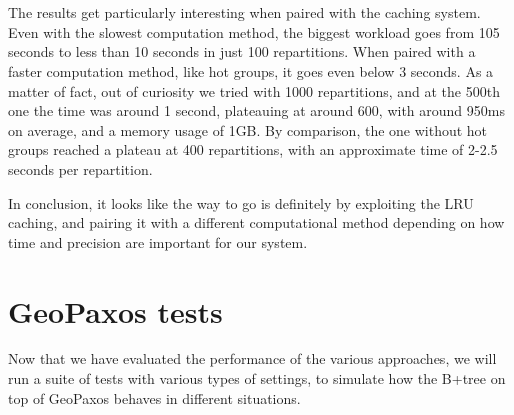 \\\\
The results get particularly interesting when paired with the caching system. Even with the slowest computation method, the biggest workload goes from 105 seconds to less than 10 seconds in just 100 repartitions. When paired with a faster computation method, like hot groups, it goes even below 3 seconds. As a matter of fact, out of curiosity we tried with 1000 repartitions, and at the 500th one the time was around 1 second, plateauing at around 600, with around 950ms on average, and a memory usage of 1GB.
By comparison, the one without hot groups reached a plateau at 400 repartitions, with an approximate time of 2-2.5 seconds per repartition.

In conclusion, it looks like the way to go is definitely by exploiting the LRU caching, and pairing it with a different computational method depending on how time and precision are important for our system.

\chapter{GeoPaxos tests}\label{sec:geopaxos-tests}
Now that we have evaluated the performance of the various approaches, we will run a suite of tests with various types of settings, to simulate how the B+tree on top of GeoPaxos behaves in different situations.

